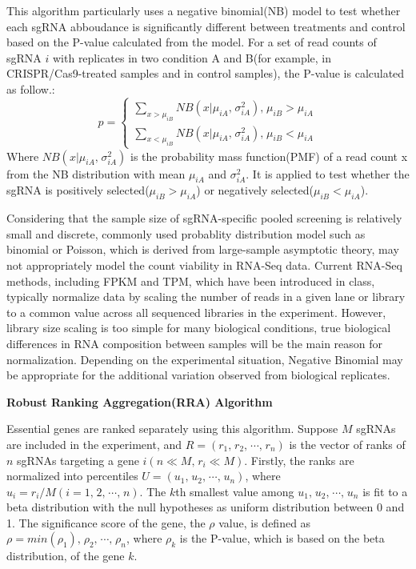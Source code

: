\documentclass[fleqn,10pt]{wlscirep}
\begin{document}
This algorithm particularly uses a negative binomial(NB) model to test whether each sgRNA abboudance is significantly different between treatments and control based on the P-value calculated from the model\cite{li2014mageck}. 
For a set of read counts of sgRNA $i$ with replicates in two condition A and B(for example, in CRISPR/Cas9-treated samples and in control samples), the P-value is calculated as follow\cite{li2014mageck}.:
\begin{equation}
    p=\left\{
\begin{aligned}
\sum_{x>\mu_{iB}}NB(x|\mu_{iA}\textrm{,}\;\sigma^2_{iA}) \textrm{,}\;\mu_{iB}>\mu_{iA}\\
\sum_{x<\mu_{iB}}NB(x|\mu_{iA}\textrm{,}\;\sigma^2_{iA}) \textrm{,}\;\mu_{iB}<\mu_{iA} 
\end{aligned}
\right.
\end{equation}
Where $NB(x|\mu_{iA}\textrm{,}\;\sigma^2_{iA})$ is the probability mass function(PMF) of a read count x from the NB distribution with mean $\mu_{iA}$ and $\sigma^2_{iA}$. It is applied to test whether the sgRNA is positively selected($\mu_{iB}>\mu_{iA}$) or negatively selected($\mu_{iB}<\mu_{iA}$).

Considering that the sample size of sgRNA-specific pooled screening is relatively small and discrete, commonly used probablity distribution model such as binomial or Poisson, which is derived from large-sample asymptotic theory, may not appropriately model the count viability in RNA-Seq data.\cite{di2011nbp} Current RNA-Seq methods, including FPKM and TPM, which have been introduced in class, typically normalize data by scaling the number of reads in a given lane or library to a common value across all sequenced libraries in the experiment.  However, library size scaling is too simple for many biological conditions, true biological differences in RNA composition between samples will be the main reason for normalization.  Depending on the experimental situation, Negative Binomial may be appropriate for the additional variation observed from biological replicates\cite{robinson2010scaling}.

\textbf{Robust Ranking Aggregation(RRA) Algorithm}\cite{li2014mageck}

Essential genes are ranked separately using this algorithm.  Suppose $M$ sgRNAs are included in the experiment, and $R=(r_1\textrm{,}\;r_2\textrm{,}\;\cdots \textrm{,}\;r_n)$ is the vector of ranks of $n$ sgRNAs targeting a gene $i(n\ll M\textrm{,}\;r_i\ll M)$.  Firstly, the ranks are normalized into percentiles $U=(u_1\textrm{,}\;u_2\textrm{,}\;\cdots \textrm{,}\;u_n)$, where $u_i=r_i/M(i=1\textrm{,}\;2\textrm{,}\;\cdots\textrm{,}\;n)$. The $k$th smallest value among $u_1\textrm{,}\;u_2\textrm{,}\;\cdots \textrm{,}\;u_n$ is fit to a beta distribution with the null hypotheses as uniform distribution between 0 and 1.  The significance score of the gene, the $\rho$ value, is defined as $\rho=min(\rho_1)\textrm{,}\;\rho_2\textrm{,}\;\cdots \textrm{,}\;\rho_n$, where $\rho_k$ is the P-value, which is based on the beta distribution, of the gene $k$.
\end{document}
